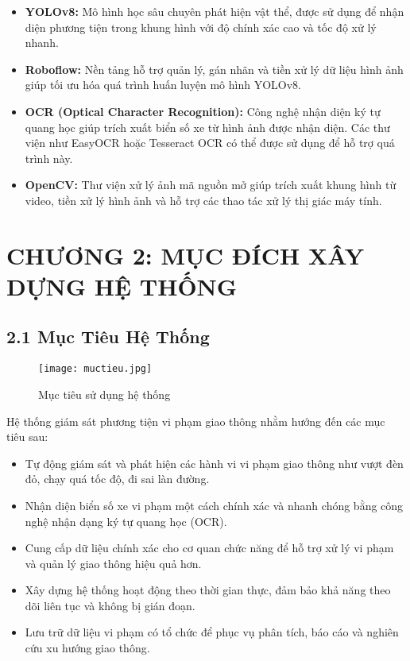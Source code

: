 \documentclass[conference]{IEEEtran}
\begin{document}
\begin{itemize}
    \item \textbf{YOLOv8:} Mô hình học sâu chuyên phát hiện vật thể, được sử dụng để nhận diện phương tiện trong khung hình với độ chính xác cao và tốc độ xử lý nhanh.
    \item \textbf{Roboflow:} Nền tảng hỗ trợ quản lý, gán nhãn và tiền xử lý dữ liệu hình ảnh giúp tối ưu hóa quá trình huấn luyện mô hình YOLOv8.
    \item \textbf{OCR (Optical Character Recognition):} Công nghệ nhận diện ký tự quang học giúp trích xuất biển số xe từ hình ảnh được nhận diện. Các thư viện như EasyOCR hoặc Tesseract OCR có thể được sử dụng để hỗ trợ quá trình này.
    \item \textbf{OpenCV:} Thư viện xử lý ảnh mã nguồn mở giúp trích xuất khung hình từ video, tiền xử lý hình ảnh và hỗ trợ các thao tác xử lý thị giác máy tính.
\end{itemize}

\section{CHƯƠNG 2: MỤC ĐÍCH XÂY DỰNG HỆ THỐNG}

\subsection{2.1 Mục Tiêu Hệ Thống}
\begin{figure}[H]
    \centering
    \texttt{[image: muctieu.jpg]} %
    \caption{Mục tiêu sử dụng hệ thống}
    \label{fig:traffic_monitoring}
\end{figure}
Hệ thống giám sát phương tiện vi phạm giao thông nhằm hướng đến các mục tiêu sau:
\begin{itemize}
    \item Tự động giám sát và phát hiện các hành vi vi phạm giao thông như vượt đèn đỏ, chạy quá tốc độ, đi sai làn đường.
    \item Nhận diện biển số xe vi phạm một cách chính xác và nhanh chóng bằng công nghệ nhận dạng ký tự quang học (OCR).
    \item Cung cấp dữ liệu chính xác cho cơ quan chức năng để hỗ trợ xử lý vi phạm và quản lý giao thông hiệu quả hơn.
    \item Xây dựng hệ thống hoạt động theo thời gian thực, đảm bảo khả năng theo dõi liên tục và không bị gián đoạn.
    \item Lưu trữ dữ liệu vi phạm có tổ chức để phục vụ phân tích, báo cáo và nghiên cứu xu hướng giao thông.
\end{itemize}
\end{document}
